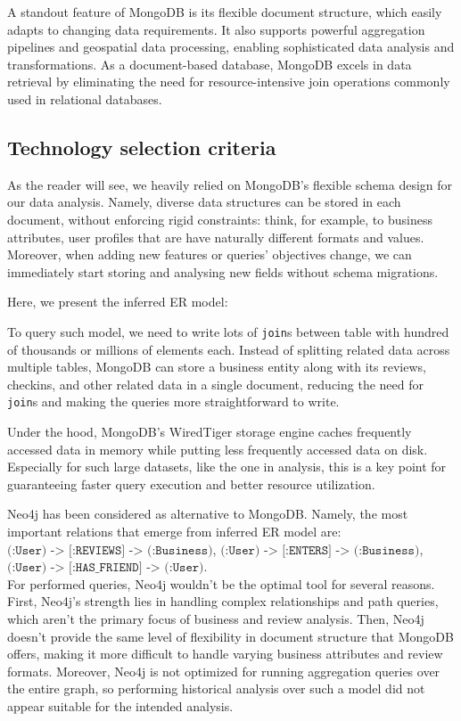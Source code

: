 \documentclass{Configuration_Files/PoliMi3i_thesis}
\begin{document}
A standout feature of MongoDB is its flexible document structure, which easily adapts to changing data requirements. It also supports powerful aggregation pipelines and geospatial data processing, enabling sophisticated data analysis and transformations. As a document-based database, MongoDB excels in data retrieval by eliminating the need for resource-intensive join operations commonly used in relational databases.

\subsection{Technology selection criteria}
As the reader will see, we heavily relied on MongoDB's flexible schema design for our data analysis. Namely, diverse data structures can be stored in each document, without enforcing rigid constraints: think, for example, to business attributes, user profiles that are have naturally different formats and values. Moreover, when adding new features or queries' objectives change, we can immediately start storing and analysing new fields without schema migrations.

Here, we present the inferred ER model:

To query such model, we need to write lots of \texttt{join}s between table with hundred of thousands or millions of elements each. Instead of splitting related data across multiple tables, MongoDB can store a business entity along with its reviews, checkins, and other related data in a single document, reducing the need for \texttt{join}s and making the queries more straightforward to write. 

Under the hood, MongoDB's WiredTiger storage engine caches frequently accessed data in memory while putting less frequently accessed data on disk. Especially for such large datasets, like the one in analysis, this is a key point for guaranteeing faster query execution and better resource utilization.


Neo4j has been considered as alternative to MongoDB. Namely, the most important relations that emerge from inferred ER model are: $\texttt{(:User) -> [:REVIEWS] -> (:Business)}$,  $\texttt{(:User) -> [:ENTERS] -> (:Business)}$,  $\texttt{(:User) -> [:HAS\_FRIEND] -> (:User)}$. \\ For performed queries, Neo4j wouldn't be the optimal tool for several reasons. First, Neo4j's strength lies in handling complex relationships and path queries, which aren't the primary focus of business and review analysis. Then, Neo4j doesn't provide the same level of flexibility in document structure that MongoDB offers, making it more difficult to handle varying business attributes and review formats. Moreover, Neo4j is not optimized for running aggregation
queries over the entire graph, so performing historical analysis over such a model did not appear suitable for the intended analysis.
\end{document}
